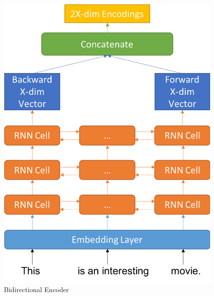 \documentclass[12pt]{article} %
\begin{document}
\begin{figure}[H]
\centering
\begin{minipage}{0.33\textwidth}
  \centering
  \includegraphics[width=\linewidth]{bidirect_txt_encoder.png}
  \caption{Bidirectional Encoder}
  \label{fig:bi-txt-encode}
\end{minipage}%
\hspace*{1.0in}
\begin{minipage}{0.28\textwidth}
  \centering

\end{minipage}
\end{figure}
\end{document}
